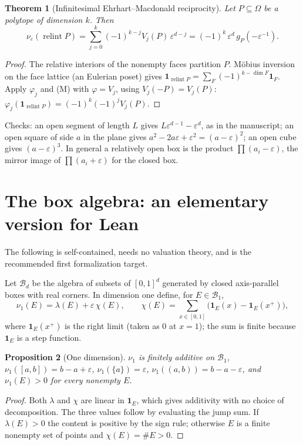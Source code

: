 \documentclass[11pt]{article}
\newtheorem{theorem}{Theorem}[section]
\newtheorem{proposition}[theorem]{Proposition}
\theoremstyle{definition}
\theoremstyle{remark}
\newcommand{\eps}{\varepsilon}
\newcommand{\nuE}{\nu_{\eps}}
\newcommand{\relint}{\operatorname{relint}}
\begin{document}
\begin{theorem}[Infinitesimal Ehrhart--Macdonald reciprocity]\label{thm:recip}
Let $P\subseteq\Omega$ be a polytope of dimension $k$. Then
\[
 \nuE(\relint P)=\sum_{j=0}^k(-1)^{k-j}V_j(P)\,\eps^{d-j}
 =(-1)^k\,\eps^d\,g_P(-\eps^{-1}).
\]
\end{theorem}
\begin{proof}
The relative interiors of the nonempty faces partition $P$. M\"obius
inversion on the face lattice (an Eulerian poset) gives
$\mathbf 1_{\relint P}=\sum_F(-1)^{k-\dim F}\mathbf 1_F$. Apply
$\varphi_j$ and (M) with $\varphi=V_j$, using $V_j(-P)=V_j(P)$:
$\varphi_j(\mathbf 1_{\relint P})=(-1)^k(-1)^jV_j(P)$.
\end{proof}

Checks: an open segment of length $L$ gives $L\eps^{d-1}-\eps^d$, as in
the manuscript; an open square of side $a$ in the plane gives
$a^2-2a\eps+\eps^2=(a-\eps)^2$; an open cube gives $(a-\eps)^3$. In
general a relatively open box is the product $\prod(a_i-\eps)$, the
mirror image of $\prod(a_i+\eps)$ for the closed box.

\section{The box algebra: an elementary version for Lean}
The following is self-contained, needs no valuation theory, and is the
recommended first formalization target.

Let $\mathcal B_d$ be the algebra of subsets of $[0,1]^d$ generated by
closed axis-parallel boxes with real corners. In dimension one define,
for $E\in\mathcal B_1$,
\[
 \nu_1(E)=\lambda(E)+\eps\,\chi(E),\qquad
 \chi(E)=\sum_{x\in[0,1]}\bigl(\mathbf 1_E(x)-\mathbf 1_E(x^+)\bigr),
\]
where $\mathbf 1_E(x^+)$ is the right limit (taken as $0$ at $x=1$); the
sum is finite because $\mathbf 1_E$ is a step function.

\begin{proposition}[One dimension]\label{prop:1d}
$\nu_1$ is finitely additive on $\mathcal B_1$, $\nu_1([a,b])=b-a+\eps$,
$\nu_1(\{a\})=\eps$, $\nu_1((a,b))=b-a-\eps$, and $\nu_1(E)>0$ for every
nonempty $E$.
\end{proposition}
\begin{proof}
Both $\lambda$ and $\chi$ are linear in $\mathbf 1_E$, which gives
additivity with no choice of decomposition. The three values follow by
evaluating the jump sum. If $\lambda(E)>0$ the content is positive by the
sign rule; otherwise $E$ is a finite nonempty set of points and
$\chi(E)=\#E>0$.
\end{proof}
\end{document}
